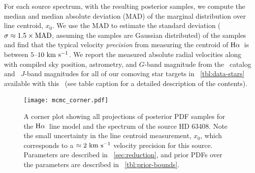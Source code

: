 \documentclass[modern, letterpaper]{aastex61}
\newcommand{\tgas}{\acronym{TGAS}}
\newcommand{\tmass}{\acronym{2MASS}}
\newcommand{\Ha}{\ensuremath{{\rm H}\alpha}}
\begin{document}
For each source spectrum, with the resulting posterior samples, we compute the
median and median absolute deviation (MAD) of the marginal distribution over
line centroid, $x_0$.
We use the MAD to estimate the standard deviation ($\sigma \approx 1.5\times{\rm
MAD}$, assuming the samples are Gaussian distributed) of the samples and find
that the typical velocity \emph{precision} from measuring the centroid of \Ha\
is between $5$--$10~\mathrm{km}~\mathrm{s}^{-1}$.
We report the measured absolute radial velocities along with compiled sky
position, astrometry, and $G$-band magnitude from the \tgas\ catalog and \tmass\
$J$-band magnitudes for all of our comoving star targets in
\tablename~\ref{tbl:data-stars} available with this \documentname\ (see table
caption for a detailed description of the contents).

\begin{figure}[!hp]
  \begin{center}
    \texttt{[image: mcmc\_corner.pdf]}
  \end{center}
  \caption{%
    A corner plot showing all projections of posterior PDF samples for the \Ha\
    line model and the spectrum of the source HD 63408.
    Note the small uncertainty in the line centroid measurement, $x_0$, which
    corresponds to a $\approx 2~\mathrm{km}~\mathrm{s}^{-1}$ velocity precision for this source.
    Parameters are described in \sectionname~\ref{sec:reduction}, and prior PDFs
    over the parameters are described in \tablename~\ref{tbl:prior-bounds}.
    \label{fig:Halpha-mcmc-corner}}
\end{figure}
\end{document}
